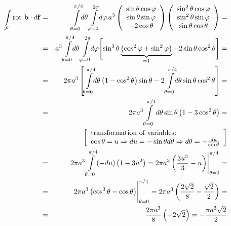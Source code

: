{\begin{enumerate}
\begin{eqnarray*}
  \int \limits_{\cal F} \textrm{rot } {\bf b} \cdot d{\bf f} & = &
  \int \limits_{\theta=0}^{\pi/4} \!\! d\theta
  \int \limits_{\varphi=0}^{2 \pi} \!\! d\varphi \, a^3
  \left(
    \begin{array}{c}
      \sin \theta \cos \varphi \\
      \sin \theta \sin \varphi \\
      -2\cos \theta
    \end{array}
  \right)
  \left(
    \begin{array}{c}
      \sin^2 \theta \cos \varphi \\
      \sin^2 \theta \sin \varphi \\
      \sin \theta \cos \theta
    \end{array}
  \right)= \\
  & = & a^3
  \int \limits_{\theta=0}^{\pi/4} \!\! d\theta
  \int \limits_{\varphi=0}^{2 \pi} \!\! d\varphi
  \Biggl[
    \sin^3\theta
    \underbrace{\left(\cos^2\varphi+\sin^2\varphi\right)}_{=1}-
      2\sin\theta\cos^2\theta
  \Biggr] = \\
  & = & 2 \pi a^3
  \left[
    \int \limits_{\theta=0}^{\pi/4} \!\! d\theta
    \left(1-\cos^2\theta\right)\sin\theta-
    2\int \limits_{\theta=0}^{\pi/4} \!\! d\theta
    \sin \theta \cos^2 \theta
  \right] = \\
  & = & 2 \pi a^3
  \int \limits_{\theta=0}^{\pi/4}d\theta
  \sin \theta \left(1-3\cos^2\theta\right) = \\
  && \left[
    \begin{array}{l}
      \mbox{transformation of variables: } \\
      \cos \theta = u \Rightarrow du=-\sin \theta d\theta
      \Rightarrow d\theta=-\frac{du}{\sin \theta}
    \end{array}
  \right] \\
  & = & 2 \pi a^3
  \int \limits_{\theta=0}^{\pi/4}(-du)\left(1-3u^2\right)=
    2 \pi a^3
    \left( \frac{3u^3}{3}-u \right)\Biggr|_{\theta=0}^{\pi/4}= \\
  & = & 2 \pi a^3
    \left(\cos^3\theta-\cos\theta \right)\Biggr|_{\theta=0}^{\pi/4}=
    2 \pi a^3
    \left(\frac{2\sqrt{2}}{8}-\frac{\sqrt{2}}{2} \right) = \\
  & = & \frac{2 \pi a^3}{8}\left(-2\sqrt{2}\right)=
    -\frac{\pi a^3 \sqrt{2}}{2}
\end{eqnarray*}



\end{enumerate}}

